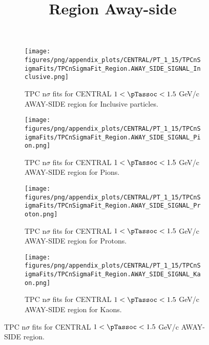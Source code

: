             \begin{figure}[H]
                \title{Region Away-side}
                \begin{subfigure}[b]{0.5\textwidth}
                    \centering
                    \texttt{[image: figures/png/appendix\_plots/CENTRAL/PT\_1\_15/TPCnSigmaFits/TPCnSigmaFit\_Region.AWAY\_SIDE\_SIGNAL\_Inclusive.png]}
                    \caption{TPC n$\sigma$ fits for CENTRAL $1 < \pTassoc < 1.5$ GeV/c AWAY-SIDE region for Inclusive particles.}
                    \label{fig:appendix_CENTRAL_$1 < \pTassoc < 1.5$ GeV/c_AWAY_SIDE_SIGNAL_Inclusive}
                \end{subfigure}
                \begin{subfigure}[b]{0.5\textwidth}
                    \centering
                    \texttt{[image: figures/png/appendix\_plots/CENTRAL/PT\_1\_15/TPCnSigmaFits/TPCnSigmaFit\_Region.AWAY\_SIDE\_SIGNAL\_Pion.png]}
                    \caption{TPC n$\sigma$ fits for CENTRAL $1 < \pTassoc < 1.5$ GeV/c AWAY-SIDE region for Pions.}
                    \label{fig:appendix_CENTRAL_$1 < \pTassoc < 1.5$ GeV/c_AWAY_SIDE_SIGNAL_Pion}
                \end{subfigure}
                \begin{subfigure}[b]{0.5\textwidth}
                    \centering
                    \texttt{[image: figures/png/appendix\_plots/CENTRAL/PT\_1\_15/TPCnSigmaFits/TPCnSigmaFit\_Region.AWAY\_SIDE\_SIGNAL\_Proton.png]}
                    \caption{TPC n$\sigma$ fits for CENTRAL $1 < \pTassoc < 1.5$ GeV/c AWAY-SIDE region for Protons.}
                    \label{fig:appendix_CENTRAL_$1 < \pTassoc < 1.5$ GeV/c_AWAY_SIDE_SIGNAL_Proton}
                \end{subfigure}
                \begin{subfigure}[b]{0.5\textwidth}
                    \centering
                    \texttt{[image: figures/png/appendix\_plots/CENTRAL/PT\_1\_15/TPCnSigmaFits/TPCnSigmaFit\_Region.AWAY\_SIDE\_SIGNAL\_Kaon.png]}
                    \caption{TPC n$\sigma$ fits for CENTRAL $1 < \pTassoc < 1.5$ GeV/c AWAY-SIDE region for Kaons.}
                    \label{fig:appendix_CENTRAL_$1 < \pTassoc < 1.5$ GeV/c_AWAY_SIDE_SIGNAL_Kaon}
                \end{subfigure}
                \caption{TPC n$\sigma$ fits for CENTRAL $1 < \pTassoc < 1.5$ GeV/c AWAY-SIDE region.}
                \label{fig:appendix_CENTRAL_$1 < \pTassoc < 1.5$ GeV/c_AWAY_SIDE_SIGNAL}
            \end{figure}
